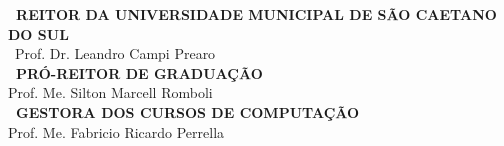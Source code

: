 
\newenvironment{estrutura}
 {
  \clearpage            %
  \pagestyle{empty}     %
 }
 {
  \clearpage            %
 }

\begin{estrutura}

  \center
    \vspace*{\fill}	
    
    {\ABNTEXchapterfont\bfseries\ REITOR DA UNIVERSIDADE MUNICIPAL DE SÃO CAETANO DO SUL} \\
    \ABNTEXchapterfont\ {Prof. Dr. Leandro Campi Prearo} \\
    \vspace{0.5cm}
    {\ABNTEXchapterfont\bfseries\ PRÓ-REITOR DE GRADUAÇÃO} \\
    Prof. Me. Silton Marcell Romboli \\
    \vspace{0.5cm}
     {\ABNTEXchapterfont\bfseries\ GESTORA DOS CURSOS DE COMPUTAÇÃO} \\
    Prof. Me. Fabricio Ricardo Perrella

    \vspace*{1cm}
\end{estrutura}
